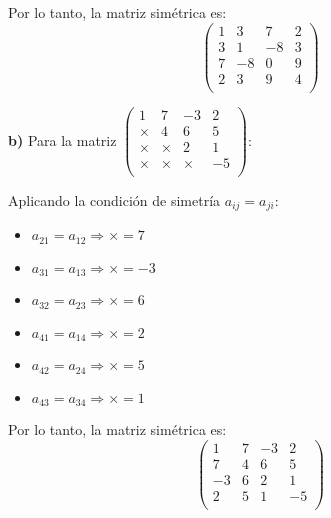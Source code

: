 \begin{prob}
\begin{myproof}
Por lo tanto, la matriz simétrica es:
$$\left( \begin{array}{cccc}
1&3 &7 &2 \\
3&1&-8 &3 \\
7&-8&0&9 \\
2&3&9&4 \\
\end{array} \right)$$

\textbf{b)} Para la matriz $\left( \begin{array}{cccc}
1&7 &-3 &2 \\
\times &4& 6 & 5 \\
\times &\times &2& 1 \\
\times &\times &\times &-5 \\
\end{array} \right)$:

Aplicando la condición de simetría $a_{ij} = a_{ji}$:
\begin{itemize}
\item $a_{21} = a_{12} \Rightarrow \times = 7$
\item $a_{31} = a_{13} \Rightarrow \times = -3$
\item $a_{32} = a_{23} \Rightarrow \times = 6$
\item $a_{41} = a_{14} \Rightarrow \times = 2$
\item $a_{42} = a_{24} \Rightarrow \times = 5$
\item $a_{43} = a_{34} \Rightarrow \times = 1$
\end{itemize}

Por lo tanto, la matriz simétrica es:
$$\left( \begin{array}{cccc}
1&7 &-3 &2 \\
7 &4& 6 & 5 \\
-3 &6 &2& 1 \\
2 &5 &1 &-5 \\
\end{array} \right)$$

\end{myproof}
\end{prob}

